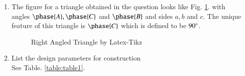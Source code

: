 \renewcommand{\theequation}{\theenumi}
\begin{enumerate}[label=\thesection.\arabic*.,ref=\thesection.\theenumi]
\item The figure for a triangle obtained in the question looks like Fig. \ref{fig:tri_right_angle}.
with angles $\phase{ A},\phase{ C}$ and $\phase{ B}$ and sides $a, b$ and $c$.  The unique feature of this triangle is $\phase{ C}$ which is defined to be $90\degree$.


\begin{figure}[!ht]
\centering
\resizebox{\columnwidth}{!}{}
\caption{Right Angled Triangle by Latex-Tikz}
\label{fig:tri_right_angle}	
\end{figure}
%
%
%
\item List the design parameters for construction
\label{const:table1}
\\
\solution See Table. \ref{table:table1}. 
%
\begin{table}[ht!]
\centering

\caption{To construct $\triangle ACB$}
\label{table:table1}	
\end{table}


\end{enumerate}
